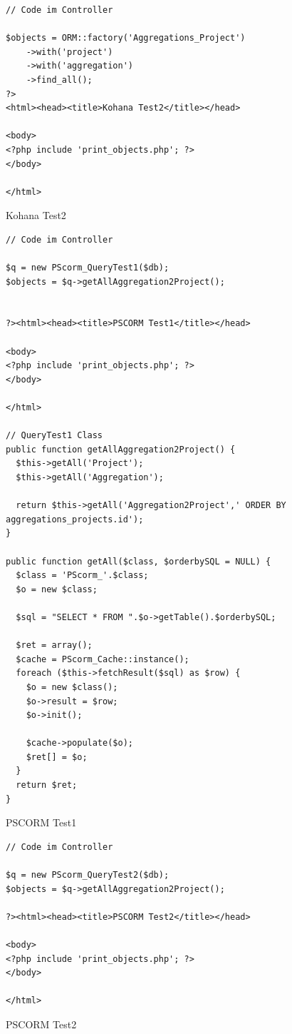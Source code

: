 \begin{fcode}
    \lstset{style=php}
    \begin{lstlisting}
// Code im Controller

$objects = ORM::factory('Aggregations_Project')
    ->with('project')
    ->with('aggregation')
    ->find_all();
?>
<html><head><title>Kohana Test2</title></head>

<body>
<?php include 'print_objects.php'; ?>
</body>

</html>
    \end{lstlisting}
    \caption{Kohana Test2}
\end{fcode}



\begin{fcode}
    \lstset{style=php}
    \begin{lstlisting}
// Code im Controller

$q = new PScorm_QueryTest1($db);
$objects = $q->getAllAggregation2Project();


?><html><head><title>PSCORM Test1</title></head>

<body>
<?php include 'print_objects.php'; ?>
</body>

</html>

// QueryTest1 Class
public function getAllAggregation2Project() {
  $this->getAll('Project');
  $this->getAll('Aggregation');
  
  return $this->getAll('Aggregation2Project',' ORDER BY aggregations_projects.id');
}

public function getAll($class, $orderbySQL = NULL) {
  $class = 'PScorm_'.$class;
  $o = new $class;
  
  $sql = "SELECT * FROM ".$o->getTable().$orderbySQL;
  
  $ret = array();
  $cache = PScorm_Cache::instance();
  foreach ($this->fetchResult($sql) as $row) {
    $o = new $class();
    $o->result = $row;
    $o->init();
    
    $cache->populate($o);
    $ret[] = $o;
  }
  return $ret;
}
    \end{lstlisting}
    \caption{PSCORM Test1}
\end{fcode}


\begin{fcode}
    \lstset{style=php}
    \begin{lstlisting}
// Code im Controller

$q = new PScorm_QueryTest2($db);
$objects = $q->getAllAggregation2Project();

?><html><head><title>PSCORM Test2</title></head>

<body>
<?php include 'print_objects.php'; ?>
</body>

</html>

    \end{lstlisting}
    \caption{PSCORM Test2}
\end{fcode}



